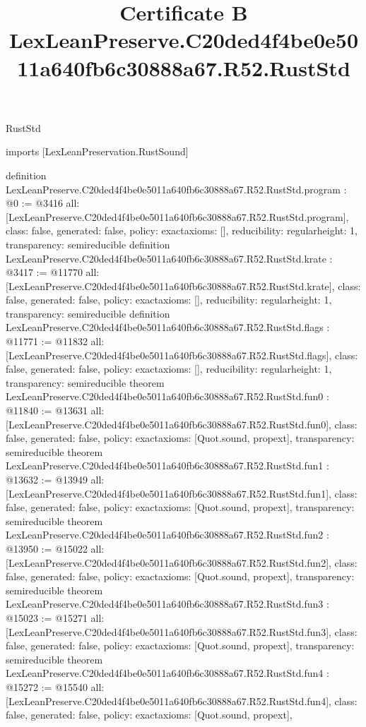 \begin{lexlean}{RustStd}
\title{Certificate B LexLeanPreserve.C20ded4f4be0e5011a640fb6c30888a67.R52.RustStd}
\begin{coremodule}
imports [LexLeanPreservation.RustSound]

definition LexLeanPreserve.C20ded4f4be0e5011a640fb6c30888a67.R52.RustStd.program : @0 := @3416 {
  all: [LexLeanPreserve.C20ded4f4be0e5011a640fb6c30888a67.R52.RustStd.program],
  class: false,
  generated: false,
  policy: exact{axioms: []},
  reducibility: regular{height: 1},
  transparency: semireducible
}
definition LexLeanPreserve.C20ded4f4be0e5011a640fb6c30888a67.R52.RustStd.krate : @3417 := @11770 {
  all: [LexLeanPreserve.C20ded4f4be0e5011a640fb6c30888a67.R52.RustStd.krate],
  class: false,
  generated: false,
  policy: exact{axioms: []},
  reducibility: regular{height: 1},
  transparency: semireducible
}
definition LexLeanPreserve.C20ded4f4be0e5011a640fb6c30888a67.R52.RustStd.flags : @11771 := @11832 {
  all: [LexLeanPreserve.C20ded4f4be0e5011a640fb6c30888a67.R52.RustStd.flags],
  class: false,
  generated: false,
  policy: exact{axioms: []},
  reducibility: regular{height: 1},
  transparency: semireducible
}
theorem LexLeanPreserve.C20ded4f4be0e5011a640fb6c30888a67.R52.RustStd.fun0 : @11840 := @13631 {
  all: [LexLeanPreserve.C20ded4f4be0e5011a640fb6c30888a67.R52.RustStd.fun0],
  class: false,
  generated: false,
  policy: exact{axioms: [Quot.sound, propext]},
  transparency: semireducible
}
theorem LexLeanPreserve.C20ded4f4be0e5011a640fb6c30888a67.R52.RustStd.fun1 : @13632 := @13949 {
  all: [LexLeanPreserve.C20ded4f4be0e5011a640fb6c30888a67.R52.RustStd.fun1],
  class: false,
  generated: false,
  policy: exact{axioms: [Quot.sound, propext]},
  transparency: semireducible
}
theorem LexLeanPreserve.C20ded4f4be0e5011a640fb6c30888a67.R52.RustStd.fun2 : @13950 := @15022 {
  all: [LexLeanPreserve.C20ded4f4be0e5011a640fb6c30888a67.R52.RustStd.fun2],
  class: false,
  generated: false,
  policy: exact{axioms: [Quot.sound, propext]},
  transparency: semireducible
}
theorem LexLeanPreserve.C20ded4f4be0e5011a640fb6c30888a67.R52.RustStd.fun3 : @15023 := @15271 {
  all: [LexLeanPreserve.C20ded4f4be0e5011a640fb6c30888a67.R52.RustStd.fun3],
  class: false,
  generated: false,
  policy: exact{axioms: [Quot.sound, propext]},
  transparency: semireducible
}
theorem LexLeanPreserve.C20ded4f4be0e5011a640fb6c30888a67.R52.RustStd.fun4 : @15272 := @15540 {
  all: [LexLeanPreserve.C20ded4f4be0e5011a640fb6c30888a67.R52.RustStd.fun4],
  class: false,
  generated: false,
  policy: exact{axioms: [Quot.sound, propext]},
}
\end{coremodule}
\end{lexlean}

